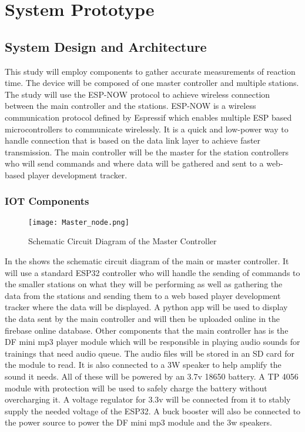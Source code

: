 \chapter{System Prototype}

\section{System Design and Architecture}
This study will employ components to gather accurate measurements of reaction time. The device will be composed of one master controller and multiple stations. The study will use the ESP-NOW protocol to achieve wireless connection between the main controller and the stations. ESP-NOW is a wireless communication protocol defined by Espressif which enables multiple ESP based microcontrollers to communicate wirelessly. It is a quick and low-power way to handle connection that is based on the data link layer to achieve faster transmission. The main controller will be the master for the station controllers who will send commands and where data will be gathered and sent to a web-based player development tracker.

\subsection{IOT Components}
\begin{figure}[h]               
	\centering                    
	\texttt{[image: Master\_node.png]}      
	\caption{Schematic Circuit Diagram of the Master Controller }
	\label{fig:Master_node}
\end{figure}

In the  shows the schematic circuit diagram of the main or master controller. It will use a standard ESP32 controller who will handle the sending of commands to the smaller stations on what they will be performing as well as gathering the data from the stations and sending them to a web based player development tracker where the data will be displayed. A python app will be used to display the data sent by the main controller and will then be uploaded online in the firebase online database. Other components that the main controller has is the DF mini mp3 player module which will be responsible in playing audio sounds for trainings that need audio queue. The audio files will be stored in an SD card for the module to read. It is also connected to a 3W speaker to help amplify the sound it needs. All of these will be powered by an 3.7v 18650 battery. A TP 4056 module  with protection will be used to safely charge the battery without overcharging it. A voltage regulator for 3.3v will be connected from it to stably supply the needed voltage of the ESP32. A buck booster will also be connected to the power source to power the DF mini mp3 module and the 3w speakers.

